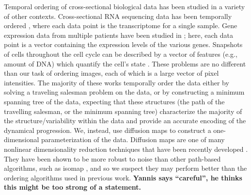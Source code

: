 \documentclass{pnastwo}
\begin{document}
\begin{article}
Temporal ordering of cross-sectional biological data has been studied in a variety of other contexts.
%
Cross-sectional RNA sequencing data has been temporally ordered \cite{anavy2014blind, trapnell2014dynamics}, where each data point is the transcriptome for a single sample.
%
Gene expression data from multiple patients have been studied in \cite{gupta2008extracting, qiu2011discovering};
here, each data point is a vector containing the expression levels of the various genes.
%
Snapshots of cells throughout the cell cycle can be described by a vector of features (e.g., amount of DNA) which quantify the cell's state  \cite{kafri2013dynamics}.
%
These problems are no different than our task of ordering images, each of which is a large vector of pixel intensities.
%
The majority of these works temporally order the data either by solving a traveling salesman problem on the data, or by constructing a minimum spanning tree of the data,
expecting that these structures (the path of the travelling salesman, or the minimum spanning tree) characterize the majority of the structure/variability within the data and provide an accurate encoding of the dynamical progression.
%
We, instead, use diffusion maps to construct a one-dimensional parameterization of the data.
%
Diffusion maps are one of many nonlinear dimensionality reduction techniques that have been recently developed \cite{Belkin2003, tenenbaum2000global, Donoho2003, Roweis2000}.
%
They have been shown to be more robust to noise than other path-based algorithms, such as isomap \cite{balasubramanian2002isomap}, and so we suspect they may perform better than the ordering algorithms used in previous work.
%
{\bf Yannis says ``careful'', he thinks this might be too strong of a statement.}
%
%


\end{article}
\end{document}

